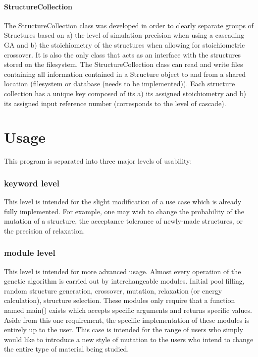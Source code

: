\paragraph{StructureCollection}
The StructureCollection class was developed in order to clearly separate groups of Structures based on a) the level of simulation precision when using a cascading GA and b) the stoichiometry of the structures when allowing for stoichiometric crossover.
It is also the only class that acts as an interface with the structures stored on the filesystem. The StructureCollection class can read and write files containing all information contained in a Structure object to and from a shared location (filesystem or database (needs to be implemented)). Each structure collection has a unique key composed of its a) its assigned stoichiometry and b) its assigned input reference number (corresponds to the level of cascade).

\section{Usage}

	This program is separated into three major levels of usability:

	\subsubsection{keyword level} This level is intended for the slight modification of a use case which is already fully implemented. For example, one may wish to change the probability of the mutation of a structure, the acceptance tolerance of newly-made structures, or the precision of relaxation.

	\subsubsection{module level} This level is intended for more advanced usage. Almost every operation of the genetic algorithm is carried out by interchangeable modules. Initial pool filling, random structure generation, crossover, mutation, relaxation (or energy calculation), structure selection. These modules only require that a function named main() exists which accepts specific arguments and returns specific values. Aside from this one requirement, the specific implementation of these modules is entirely up to the user. This case is intended for the range of users who simply would like to introduce a new style of mutation to the users who intend to change the entire type of material being studied.

